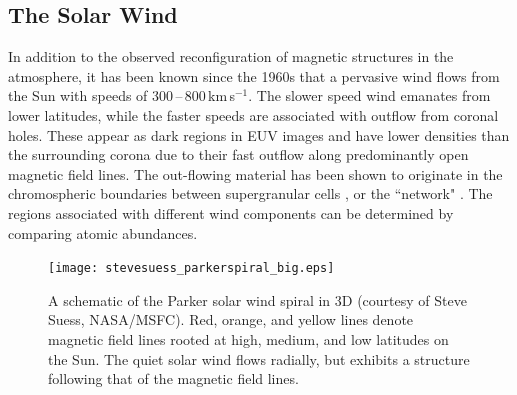 
\subsection{The Solar Wind}\label{sect:solarwind}


In addition to the observed reconfiguration of magnetic structures in the atmosphere, it has been known since the 1960s that a pervasive wind flows from the Sun with speeds of 300\,--\,800\,km\,s$^{-1}$. The slower speed wind emanates from lower latitudes, while the faster speeds are associated with outflow from coronal holes. These appear as dark regions in \gls{EUV} images and have lower densities than the surrounding corona due to their fast outflow along predominantly open magnetic field lines. The out-flowing material has been shown to originate in the chromospheric boundaries between supergranular cells \citep{Hassler:1999}, or the ``network" \citep{Gallagher:1998}. The regions associated with different wind components can be determined by comparing atomic abundances. 

\begin{figure}[!t]
\centerline{\texttt{[image: stevesuess\_parkerspiral\_big.eps]}}
\caption[A schematic of the Parker solar wind spiral in 3D.]{A schematic of the Parker solar wind spiral in 3D (courtesy of Steve Suess, NASA/MSFC). Red, orange, and yellow lines denote magnetic field lines rooted at high, medium, and low latitudes on the Sun. The quiet solar wind flows radially, but exhibits a structure following that of the magnetic field lines.}
\label{fig:parkspiral}
\end{figure}

